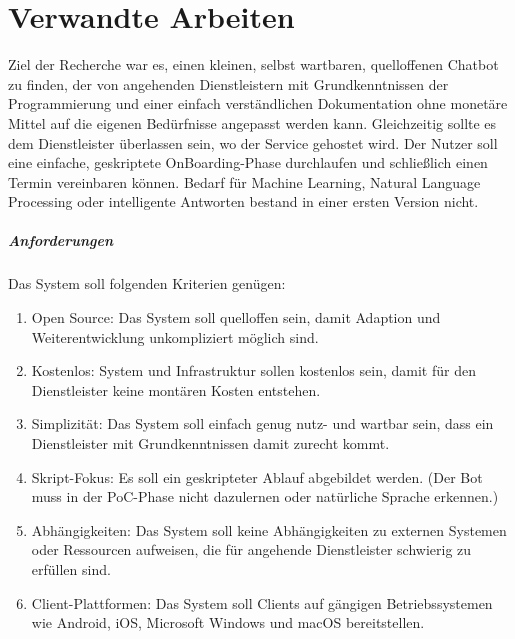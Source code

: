\chapter{Verwandte Arbeiten} \label{Verwandte Arbeiten}

    Ziel der Recherche war es, einen kleinen, selbst wartbaren, quelloffenen Chatbot zu finden, der von angehenden Dienstleistern mit Grundkenntnissen der Programmierung und einer einfach verständlichen Dokumentation ohne monetäre Mittel auf die eigenen Bedürfnisse angepasst werden kann. Gleichzeitig sollte es dem Dienstleister überlassen sein, wo der Service gehostet wird. Der Nutzer soll eine einfache, geskriptete OnBoarding-Phase durchlaufen und schließlich einen Termin vereinbaren können. Bedarf für Machine Learning, Natural Language Processing oder intelligente Antworten bestand in einer ersten Version nicht. 

    \paragraph{Anforderungen}
    Das System soll folgenden Kriterien genügen:
    \begin{enumerate}
        \item Open Source: Das System soll quelloffen sein, damit Adaption und Weiterentwicklung unkompliziert möglich sind.
        \item Kostenlos: System und Infrastruktur sollen kostenlos sein, damit für den Dienstleister keine montären Kosten entstehen.
        \item Simplizität: Das System soll einfach genug nutz- und wartbar sein, dass ein Dienstleister mit Grundkenntnissen damit zurecht kommt.
        \item Skript-Fokus: Es soll ein geskripteter Ablauf abgebildet werden. (Der Bot muss in der PoC-Phase nicht dazulernen oder natürliche Sprache erkennen.) 
        \item Abhängigkeiten: Das System soll keine Abhängigkeiten zu externen Systemen oder Ressourcen aufweisen, die für angehende Dienstleister schwierig zu erfüllen sind.
        \item Client-Plattformen: Das System soll Clients auf gängigen Betriebssystemen wie Android, iOS, Microsoft Windows und macOS bereitstellen.
    \end{enumerate}

